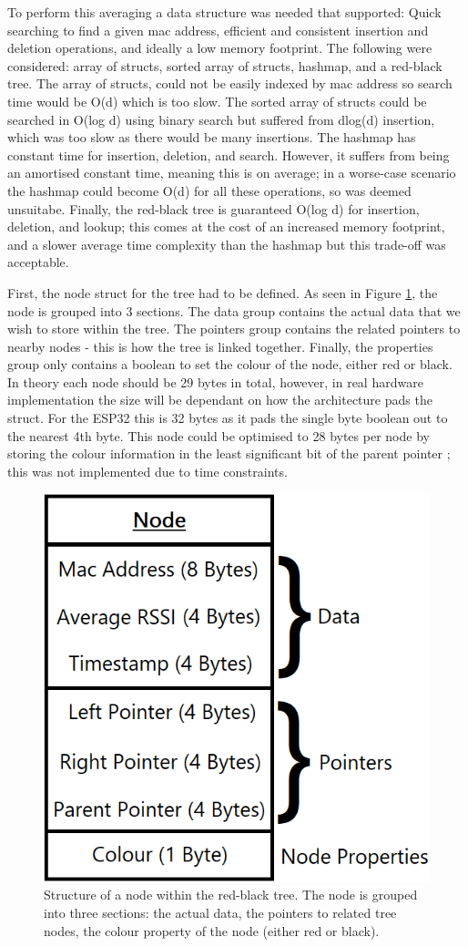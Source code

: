 \documentclass{l4proj}
\begin{document}
To perform this averaging a data structure was needed that supported: Quick searching to find a given mac address, efficient and consistent insertion and deletion operations, and ideally a low memory footprint. The following were considered: array of structs, sorted array of structs, hashmap, and a red-black tree. The array of structs, could not be easily indexed by mac address so search time would be O(d) which is too slow. The sorted array of structs could be searched in O(log d) using binary search but suffered from dlog(d) insertion, which was too slow as there would be many insertions. The hashmap has constant time for insertion, deletion, and search. However, it suffers from being an amortised constant time, meaning this is on average; in a worse-case scenario the hashmap could become O(d) for all these operations, so was deemed unsuitabe. Finally, the red-black tree is guaranteed O(log d) for insertion, deletion, and lookup; this comes at the cost of an increased memory footprint, and a slower average time complexity than the hashmap but this trade-off was acceptable.

First, the node struct for the tree had to be defined. As seen in Figure \ref{fig:tree_node}, the node is grouped into 3 sections. The data group contains the actual data that we wish to store within the tree. The pointers group contains the related pointers to nearby nodes - this is how the tree is linked together. Finally, the properties group only contains a boolean to set the colour of the node, either red or black. In theory each node should be 29 bytes in total, however, in real hardware implementation the size will be dependant on how the architecture pads the struct. For the ESP32 this is 32 bytes as it pads the single byte boolean out to the nearest 4th byte. This node could be optimised to 28 bytes per node by storing the colour information in the least significant bit of the parent pointer \citep{munoz_bannalia_2008}; this was not implemented due to time constraints.

\begin{figure}[!htb]
    \centering
    \includegraphics[width=0.4\linewidth]{images/rbtree_node.png}

    \caption{ Structure of a node within the red-black tree. The node is grouped into three sections: the actual data, the pointers to related tree nodes, the colour property of the node (either red or black). }

    \label{fig:tree_node}
\end{figure}
\end{document}
